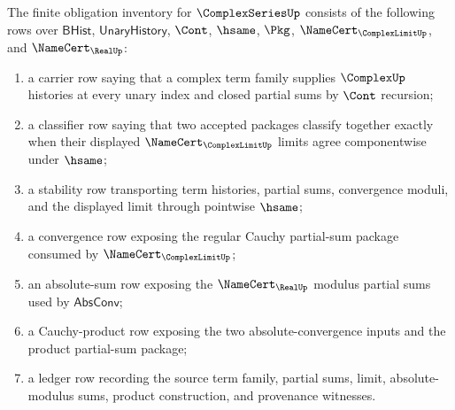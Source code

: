 \begin{definition}
\label{def:complex-series-obligation-inventory}
The finite obligation inventory for $\ComplexSeriesUp$ consists of the following rows over $\mathsf{BHist}$, $\mathsf{UnaryHistory}$, $\Cont$, $\hsame$, $\Pkg$, $\NameCert_{\ComplexLimitUp}$, and $\NameCert_{\RealUp}$:
\begin{enumerate}
  \item a carrier row saying that a complex term family supplies $\ComplexUp$ histories at every unary index and closed partial sums by $\Cont$ recursion;
  \item a classifier row saying that two accepted packages classify together exactly when their displayed $\NameCert_{\ComplexLimitUp}$ limits agree componentwise under $\hsame$;
  \item a stability row transporting term histories, partial sums, convergence moduli, and the displayed limit through pointwise $\hsame$;
  \item a convergence row exposing the regular Cauchy partial-sum package consumed by $\NameCert_{\ComplexLimitUp}$;
  \item an absolute-sum row exposing the $\NameCert_{\RealUp}$ modulus partial sums used by $\mathsf{AbsConv}$;
  \item a Cauchy-product row exposing the two absolute-convergence inputs and the product partial-sum package;
  \item a ledger row recording the source term family, partial sums, limit, absolute-modulus sums, product construction, and provenance witnesses.
\end{enumerate}
\end{definition}

